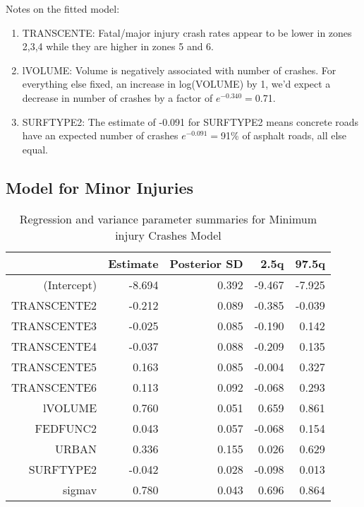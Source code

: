 \documentclass[a4paper]{article}\usepackage[]{graphicx}\usepackage[]{color}
\begin{document}
Notes on the fitted model:

\begin{enumerate}
\item
TRANSCENTE: Fatal/major injury crash rates appear to be lower in zones 2,3,4 while they are higher in zones 5 and 6. 

\item
lVOLUME: Volume is negatively associated with number of crashes. For everything else fixed, an increase in log(VOLUME) by 1, we'd expect a decrease in number of crashes by a factor of $e^{-0.340}=$0.71.

\item
SURFTYPE2: The estimate of -0.091 for SURFTYPE2 means concrete roads have an expected number of crashes $e^{-0.091}=$91\% of asphalt roads, all else equal.

\end{enumerate}


\clearpage
\subsection{Model for Minor Injuries}

\begin{table}[ht]
\centering
\begin{tabular}{rrrrr}
  \hline
 & Estimate & Posterior SD & 2.5q & 97.5q \\ 
  \hline
(Intercept) & -8.694 & 0.392 & -9.467 & -7.925 \\ 
  TRANSCENTE2 & -0.212 & 0.089 & -0.385 & -0.039 \\ 
  TRANSCENTE3 & -0.025 & 0.085 & -0.190 & 0.142 \\ 
  TRANSCENTE4 & -0.037 & 0.088 & -0.209 & 0.135 \\ 
  TRANSCENTE5 & 0.163 & 0.085 & -0.004 & 0.327 \\ 
  TRANSCENTE6 & 0.113 & 0.092 & -0.068 & 0.293 \\ 
  lVOLUME & 0.760 & 0.051 & 0.659 & 0.861 \\ 
  FEDFUNC2 & 0.043 & 0.057 & -0.068 & 0.154 \\ 
  URBAN & 0.336 & 0.155 & 0.026 & 0.629 \\ 
  SURFTYPE2 & -0.042 & 0.028 & -0.098 & 0.013 \\ 
  sigmav & 0.780 & 0.043 & 0.696 & 0.864 \\ 
   \hline
\end{tabular}
\caption{Regression and variance parameter summaries for Minimum injury Crashes Model} 
\label{mincrash}
\end{table}
\end{document}
